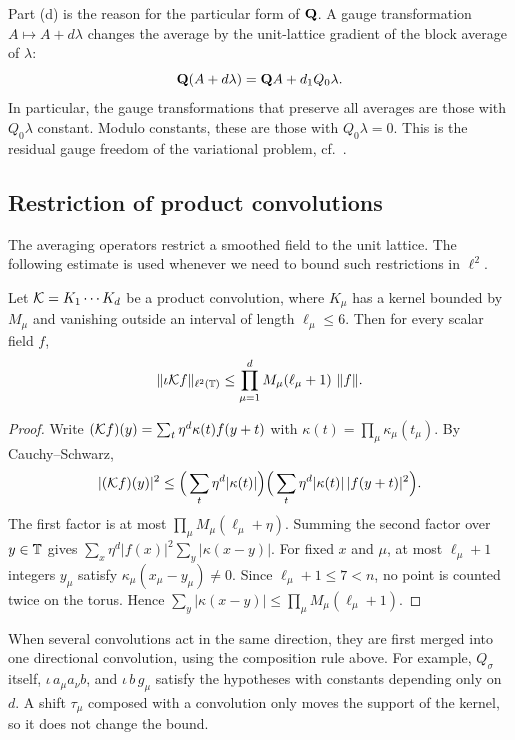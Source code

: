 Part (d) is the reason for the particular form of $\mathbf Q$. A gauge transformation $A\mapsto A+d\lambda$ changes the average by the unit-lattice gradient of the block average of $\lambda$:
\[
\mathbf Q(A+d\lambda)=\mathbf Q A+d_1 Q_0\lambda .
\]
In particular, the gauge transformations that preserve all averages are those with $Q_0\lambda$ constant. Modulo constants, these are those with $Q_0\lambda=0$. This is the residual gauge freedom of the variational problem, cf.\ \cite[(1.13), (1.20)]{BalPropI}.

\subsection{Restriction of product convolutions}

The averaging operators restrict a smoothed field to the unit lattice. The following estimate is used whenever we need to bound such restrictions in $\ell^2$.

\begin{lemma}\label{lem:restriction}
Let $\mathcal K=K_1\cdots K_d$ be a product convolution, where $K_\mu$ has a kernel bounded by $M_\mu$ and vanishing outside an interval of length $\ell_\mu\le6$. Then for every scalar field $f$,
\[
\|\iota\mathcal K f\|_{\ell^2(\mathbb T)}\le\prod_{\mu=1}^dM_\mu(\ell_\mu+1)\ \|f\| .
\]
\end{lemma}

\begin{proof}
Write $(\mathcal K f)(y)=\sum_t\eta^d\kappa(t)f(y+t)$ with $\kappa(t)=\prod_\mu\kappa_\mu(t_\mu)$. By Cauchy--Schwarz,
\[
|(\mathcal K f)(y)|^2\le\Big(\sum_t\eta^d|\kappa(t)|\Big)\Big(\sum_t\eta^d|\kappa(t)|\,|f(y+t)|^2\Big).
\]
The first factor is at most $\prod_\mu M_\mu(\ell_\mu+\eta)$. Summing the second factor over $y\in\mathbb T$ gives $\sum_x\eta^d|f(x)|^2\sum_y|\kappa(x-y)|$. For fixed $x$ and $\mu$, at most $\ell_\mu+1$ integers $y_\mu$ satisfy $\kappa_\mu(x_\mu-y_\mu)\neq0$. Since $\ell_\mu+1\le7<n$, no point is counted twice on the torus. Hence $\sum_y|\kappa(x-y)|\le\prod_\mu M_\mu(\ell_\mu+1)$.
\end{proof}

When several convolutions act in the same direction, they are first merged into one directional convolution, using the composition rule above. For example, $Q_\sigma$ itself, $\iota\,a_\mu a_\nu b$, and $\iota\,b\,g_\mu$ satisfy the hypotheses with constants depending only on $d$. A shift $\tau_\mu$ composed with a convolution only moves the support of the kernel, so it does not change the bound.
